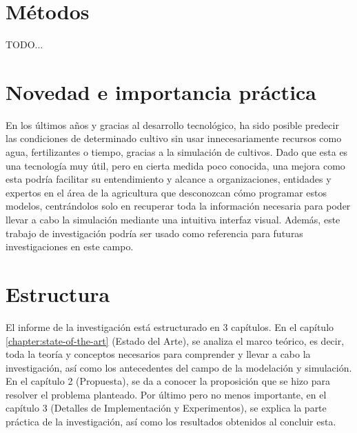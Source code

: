 \section*{Métodos}
TODO...

\section*{Novedad e importancia práctica}
En los últimos años y gracias al desarrollo tecnológico, ha sido posible predecir las condiciones de determinado cultivo sin usar innecesariamente recursos como agua, fertilizantes o tiempo, gracias a la simulación de cultivos. Dado que esta es una tecnología muy útil, pero en cierta medida poco conocida, una mejora como esta podría facilitar su entendimiento y alcance a organizaciones, entidades y expertos en el área de la agricultura que desconozcan cómo programar estos modelos, centrándolos solo en recuperar toda la información necesaria para poder llevar a cabo la simulación mediante una intuitiva interfaz visual. Además, este trabajo de investigación podría ser usado como referencia para futuras investigaciones en este campo.

\section*{Estructura}
El informe de la investigación está estructurado en 3 capítulos. En el capítulo \ref{chapter:state-of-the-art} (Estado del Arte), se analiza el marco teórico, es decir, toda la teoría y conceptos necesarios para comprender y llevar a cabo la investigación, así como los antecedentes del campo de la modelación y simulación. En el capítulo 2 (Propuesta), se da a conocer la proposición que se hizo para resolver el problema planteado. Por último pero no menos importante, en el capítulo 3 (Detalles de Implementación y Experimentos), se explica la parte práctica de la investigación, así como los resultados obtenidos al concluir esta.